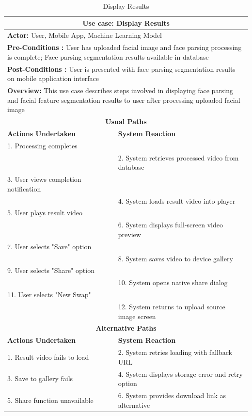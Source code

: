\documentclass[12pt,a4paper]{report}
\begin{document}
\begin{table}[H]
\centering
\caption{Display Results}
\begin{tabular}{|p{6cm}|p{6cm}|}
\hline
\multicolumn{2}{|c|}{\textbf{Use case: Display Results}} \\
\hline
\multicolumn{2}{|p{12cm}|}{\textbf{Actor:} User, Mobile App, Machine Learning Model} \\
\hline
\multicolumn{2}{|p{12cm}|}{\textbf{Pre-Conditions :} User has uploaded facial image and face parsing processing is complete; Face parsing segmentation results available in database} \\
\hline
\multicolumn{2}{|p{12cm}|}{\textbf{Post-Conditions :} User is presented with face parsing segmentation results on mobile application interface} \\
\hline
\multicolumn{2}{|p{12cm}|}{\textbf{Overview:} This use case describes steps involved in displaying face parsing and facial feature segmentation results to user after processing uploaded facial image} \\
\hline
\multicolumn{2}{|c|}{\textbf{Usual Paths}} \\
\hline
\textbf{Actions Undertaken} & \textbf{System Reaction} \\
\hline
1. Processing completes & \\
\hline
 & 2. System retrieves processed video from database \\
\hline
3. User views completion notification & \\
\hline
 & 4. System loads result video into player \\
\hline
5. User plays result video & \\
\hline
 & 6. System displays full-screen video preview \\
\hline
7. User selects "Save" option & \\
\hline
 & 8. System saves video to device gallery \\
\hline
9. User selects "Share" option & \\
\hline
 & 10. System opens native share dialog \\
\hline
11. User selects "New Swap" & \\
\hline
 & 12. System returns to upload source image screen \\
\hline
\multicolumn{2}{|c|}{\textbf{Alternative Paths}} \\
\hline
\textbf{Actions Undertaken} & \textbf{System Reaction} \\
\hline
1. Result video fails to load & 2. System retries loading with fallback URL \\
\hline
3. Save to gallery fails & 4. System displays storage error and retry option \\
\hline
5. Share function unavailable & 6. System provides download link as alternative \\
\hline
\end{tabular}
\end{table}
\end{document}
